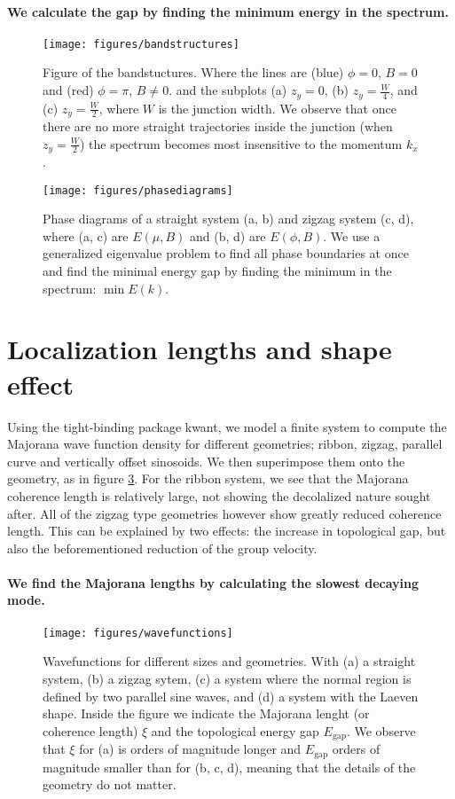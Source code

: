 \documentclass[english, twocolumn, 10pt, aps, superscriptaddress, floatfix, prb, citeautoscript]{revtex4-1}
\renewcommand{\comment}[2]{#2}
\renewcommand{\comment}{\paragraph}
\begin{document}
\comment{We calculate the gap by finding the minimum energy in the spectrum.}

\begin{figure}[!htb]
\texttt{[image: figures/bandstructures]}
\caption{Figure of the bandstuctures.
Where the lines are (blue) $\phi=0$, $B=0$ and (red) $\phi=\pi$, $B \ne 0$.
and the subplots (a) $z_y=0$, (b) $z_y=\frac{W}{4}$, and (c) $z_y=\frac{W}{2}$, where $W$ is the junction width.
We observe that once there are no more straight trajectories inside the junction (when $z_y=\frac{W}{2}$) the spectrum becomes most insensitive to the momentum $k_x$.
\label{fig:bandstuctures}}
\end{figure}

\begin{figure}[!htb]
\texttt{[image: figures/phasediagrams]}
\caption{Phase diagrams of a straight system (a, b) and zigzag system (c, d), where (a, c) are $E(\mu, B)$ and (b, d) are $E(\phi, B)$.
We use a generalized eigenvalue problem to find all phase boundaries at once and find the minimal energy gap by finding the minimum in the spectrum: $\min{E(k)}$.
\label{fig:phasediagrams}}
\end{figure}

\section{Localization lengths and shape effect}
Using the tight-binding package kwant, we model a finite system to compute the Majorana wave function density for different geometries; ribbon, zigzag, parallel curve and vertically offset sinosoids.
We then superimpose them onto the geometry, as in figure \ref{fig:wavefunctions}.
For the ribbon system, we see that the Majorana coherence length is relatively large, not showing the decolalized nature sought after.
All of the zigzag type geometries however show greatly reduced coherence length.\tabularnewline
This can be explained by two effects: the increase in topological gap, but also the beforementioned reduction of the group velocity.
\comment{We find the Majorana lengths by calculating the slowest decaying mode.}

\begin{figure}[!htb]
\texttt{[image: figures/wavefunctions]}
\caption{Wavefunctions for different sizes and geometries.
With (a) a straight system, (b) a zigzag sytem, (c) a system where the normal region is defined by two parallel sine waves, and (d) a system with the Laeven shape.
Inside the figure we indicate the Majorana lenght (or coherence length) $\xi$ and the topological energy gap $E_\textrm{gap}.$
We observe that $\xi$ for (a) is orders of magnitude longer and $E_\textrm{gap}$ orders of magnitude smaller than for (b, c, d), meaning that the details of the geometry do not matter.
\label{fig:wavefunctions}}
\end{figure}
\end{document}
